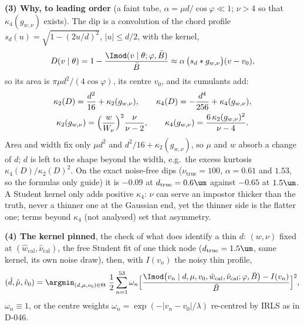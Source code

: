 \medskip
\textbf{(3) Why, to leading order} (a faint tube, $\alpha=\mu d/\cos\varphi\ll1$; $\nu>4$ so that $\kappa_4(g_{w,\nu})$ exists). The dip is a convolution of the chord profile $s_d(u)=\sqrt{1-(2u/d)^{2}}$, $\lvert u\rvert\le d/2$, with the kernel,
\begin{equation*}
D(v\mid\theta)=1-\frac{\Imod(v\mid\theta;\varphi,\bar B)}{\bar B}\approx\alpha\,\bigl(s_d*g_{w,\nu}\bigr)(v-v_0),
\end{equation*}
so its area is $\pi\mu d^{2}/(4\cos\varphi)$, its centre $v_0$, and its cumulants add:
\begin{gather*}
\kappa_2(D)=\frac{d^{2}}{16}+\kappa_2(g_{w,\nu}),\qquad
\kappa_4(D)=-\frac{d^{4}}{256}+\kappa_4(g_{w,\nu}),\\
\kappa_2(g_{w,\nu})=\Bigl(\frac{w}{W_\nu}\Bigr)^{2}\frac{\nu}{\nu-2},\qquad
\kappa_4(g_{w,\nu})=\frac{6\,\kappa_2(g_{w,\nu})^{2}}{\nu-4}.
\end{gather*}
Area and width fix only $\mu d^{2}$ and $d^{2}/16+\kappa_2(g_{w,\nu})$, so $\mu$ and $w$ absorb a change of $d$; $d$ is left to the shape beyond the width, e.g.\ the excess kurtosis $\kappa_4(D)/\kappa_2(D)^{2}$. On the exact noise-free dips ($\nu_{\mathrm{true}}=100$, $\alpha=0.61$ and $1.53$, so the formulas only guide) it is $-0.09$ at $d_{\mathrm{true}}=0.6\um$ against $-0.65$ at $1.5\um$. A Student kernel only adds positive $\kappa_4$: $\nu$ can serve an impostor thicker than the truth, never a thinner one at the Gaussian end, yet the thinner side is the flatter one; terms beyond $\kappa_4$ (not analysed) set that asymmetry.

\medskip
\textbf{(4) The kernel pinned}, the check of what does identify a thin $d$: $(w,\nu)$ fixed at $(\hat w_{\mathrm{cal}},\hat\nu_{\mathrm{cal}})$, the free Student fit of one thick node ($d_{\mathrm{true}}=1.5\um$, same kernel, its own noise draw), then, with $I(v_n)$ the noisy thin profile,
\begin{equation*}
(\hat d,\hat\mu,\hat v_0)=\argmin_{(d,\mu,v_0)\in\Theta}\ \frac12\sum_{n=1}^{53}\omega_n\Bigl[\frac{\Imod\bigl(v_n\mid d,\mu,v_0,\hat w_{\mathrm{cal}},\hat\nu_{\mathrm{cal}};\varphi,\bar B\bigr)-I(v_n)}{\bar B}\Bigr]^{2},
\end{equation*}
$\omega_n\equiv1$, or the centre weights $\omega_n=\exp(-\lvert v_n-v_0\rvert/\lambda)$ re-centred by IRLS as in D-046.
